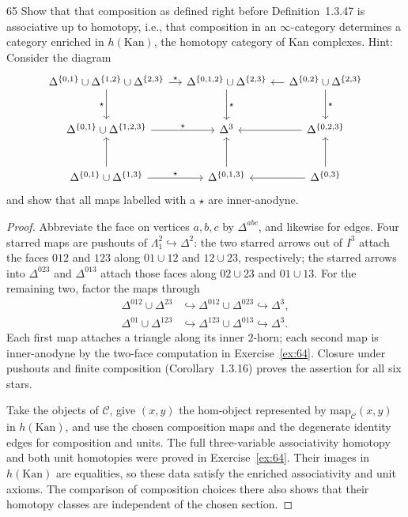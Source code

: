 \begin{exercise}{65}
Show that that composition as defined right before Definition~1.3.47 is associative up to homotopy, i.e., that composition in an $\infty$-category determines a category enriched
in $h(\mathrm{Kan})$, the homotopy category of Kan complexes. Hint: Consider the diagram
\[
 \begin{tikzcd}[column sep=small,row sep=large]
  \Delta^{\{0,1\}}\cup\Delta^{\{1,2\}}\cup\Delta^{\{2,3\}}
    \arrow[r,"\star"] \arrow[d,"\star"']
    & \Delta^{\{0,1,2\}}\cup\Delta^{\{2,3\}}
      \arrow[d,"\star"]
    & \Delta^{\{0,2\}}\cup\Delta^{\{2,3\}}
      \arrow[l] \arrow[d,"\star"] \\
  \Delta^{\{0,1\}}\cup\Delta^{\{1,2,3\}}
    \arrow[r,"\star"]
    & \Delta^3
    & \Delta^{\{0,2,3\}} \arrow[l] \\
  \Delta^{\{0,1\}}\cup\Delta^{\{1,3\}}
    \arrow[r,"\star"] \arrow[u]
    & \Delta^{\{0,1,3\}} \arrow[u]
    & \Delta^{\{0,3\}} \arrow[l] \arrow[u]
 \end{tikzcd}
\]
and show that all maps labelled with a $\star$ are inner-anodyne.

\begin{proof}
Abbreviate the face on vertices $a,b,c$ by
$\Delta^{abc}$, and likewise for edges.
Four starred maps are pushouts of
$\Lambda^2_1\hookrightarrow\Delta^2$:
the two starred arrows out of $I^3$ attach the faces
$012$ and $123$ along $01\cup12$ and $12\cup23$,
respectively; the starred arrows into $\Delta^{023}$ and
$\Delta^{013}$ attach those faces along $02\cup23$ and
$01\cup13$.
For the remaining two, factor the maps through
\[
\begin{aligned}
 \Delta^{012}\cup\Delta^{23}
   &\hookrightarrow \Delta^{012}\cup\Delta^{023}
     \hookrightarrow\Delta^3,\\
 \Delta^{01}\cup\Delta^{123}
   &\hookrightarrow \Delta^{123}\cup\Delta^{013}
     \hookrightarrow\Delta^3.
\end{aligned}
\]
Each first map attaches a triangle along its inner
$2$-horn; each second map is inner-anodyne by the
two-face computation in Exercise~\ref{ex:64}.
Closure under pushouts and finite composition
(Corollary~1.3.16) proves the assertion for all six stars.

Take the objects of $\mathcal C$, give $(x,y)$ the
hom-object represented by
$\mathrm{map}_{\mathcal C}(x,y)$ in $h(\mathrm{Kan})$,
and use the chosen composition maps and the degenerate
identity edges for composition and units.
The full three-variable associativity homotopy and both
unit homotopies were proved in Exercise~\ref{ex:64}.
Their images in $h(\mathrm{Kan})$ are equalities, so these
data satisfy the enriched associativity and unit axioms.
The comparison of composition choices there also shows
that their homotopy classes are independent of the
chosen section.
\end{proof}
\end{exercise}
